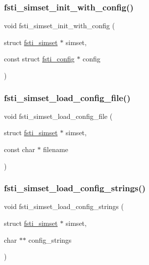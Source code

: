 \subsubsection{\texorpdfstring{fsti\+\_\+simset\+\_\+init\+\_\+with\+\_\+config()}{fsti\_simset\_init\_with\_config()}}
{\footnotesize\ttfamily void fsti\+\_\+simset\+\_\+init\+\_\+with\+\_\+config (\begin{DoxyParamCaption}\item[{struct \mbox{\hyperlink{structfsti__simset}{fsti\+\_\+simset}} $\ast$}]{simset,  }\item[{const struct \mbox{\hyperlink{structfsti__config}{fsti\+\_\+config}} $\ast$}]{config }\end{DoxyParamCaption})}

\mbox{\label{fsti-simset_8h_a8635ad080108f9d35e1e0f01d9e7c855}} 
\subsubsection{\texorpdfstring{fsti\+\_\+simset\+\_\+load\+\_\+config\+\_\+file()}{fsti\_simset\_load\_config\_file()}}
{\footnotesize\ttfamily void fsti\+\_\+simset\+\_\+load\+\_\+config\+\_\+file (\begin{DoxyParamCaption}\item[{struct \mbox{\hyperlink{structfsti__simset}{fsti\+\_\+simset}} $\ast$}]{simset,  }\item[{const char $\ast$}]{filename }\end{DoxyParamCaption})}

\mbox{\label{fsti-simset_8h_ab81c9af7043163aa922dd03128d18f91}} 
\subsubsection{\texorpdfstring{fsti\+\_\+simset\+\_\+load\+\_\+config\+\_\+strings()}{fsti\_simset\_load\_config\_strings()}}
{\footnotesize\ttfamily void fsti\+\_\+simset\+\_\+load\+\_\+config\+\_\+strings (\begin{DoxyParamCaption}\item[{struct \mbox{\hyperlink{structfsti__simset}{fsti\+\_\+simset}} $\ast$}]{simset,  }\item[{char $\ast$$\ast$}]{config\+\_\+strings }\end{DoxyParamCaption})}

